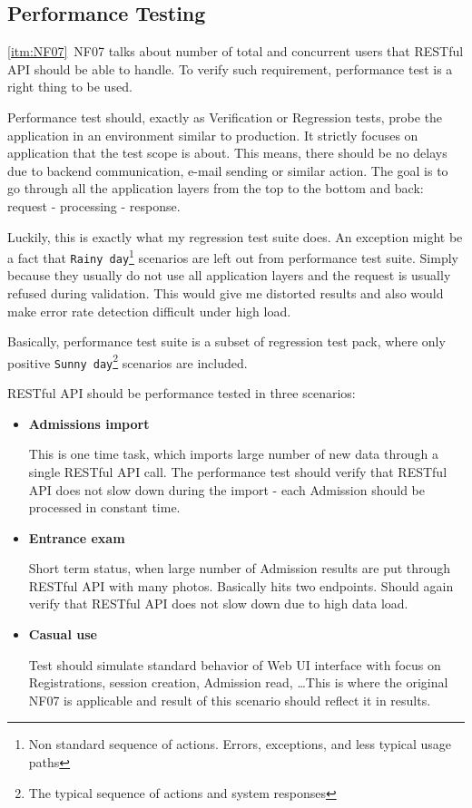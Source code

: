 	\subsection{Performance Testing}
	
	\ref{itm:NF07}~NF07 talks about number of total and concurrent users that RESTful API should be able to handle. To
	verify such requirement, performance test is a right thing to be used.
	
	Performance test should, exactly as Verification or Regression tests, probe the application in an environment similar
	to production.
	It strictly focuses on application that the test scope is about. This means, there should be no delays due to backend
	communication, e-mail sending or similar action. The goal is to go through all the application layers from the top to
	the bottom and back: request - processing - response.
	
	Luckily, this is exactly what my regression test suite does. An exception might be a fact that
	\verb|Rainy day|\footnote{Non standard sequence of actions. Errors, exceptions, and less typical usage paths}
	scenarios are left out from performance test suite. Simply because they usually do not use all application layers and the request is usually refused during validation. This would give me distorted results and also would make error rate
	detection difficult under high load.
	
	Basically, performance test suite is a subset of regression test pack, where only positive
	\verb|Sunny day|\footnote{The typical sequence of actions and system responses} scenarios are included.
	
	RESTful API should be performance tested in three scenarios:
	
	\begin{itemize}
		\item \textbf{Admissions import}
		
		This is one time task, which imports large number of new data through a single RESTful API call. The performance test
		should verify that RESTful API does not slow down during the import - each Admission should be processed in constant
		time.
		\item \textbf{Entrance exam}
		
		Short term status, when large number of Admission results are put through RESTful API with many photos. Basically hits
		two endpoints. Should again verify that RESTful API does not slow down due to high data load.
		\item \textbf{Casual use}
		
		Test should simulate standard behavior of Web UI interface with focus on Registrations, session creation, Admission
		read, \ldots This is where the original NF07 is applicable and result of this scenario should reflect it in results.
	\end{itemize}
	
